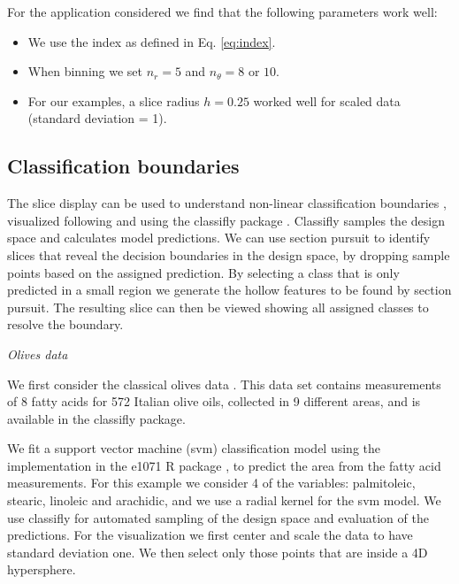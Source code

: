 \documentclass[]{interact}
\theoremstyle{plain}%
\theoremstyle{definition}
\theoremstyle{remark}
\def\tightlist{}
\begin{document}
For the application considered we find that the following parameters
work well:

\begin{itemize}
\tightlist
\item
  We use the index as defined in Eq. \ref{eq:index}.
\item
  When binning we set \(n_r=5\) and \(n_{\theta}=8\) or \(10\).
\item
  For our examples, a slice radius \(h=0.25\) worked well for scaled
  data (standard deviation = 1).
\end{itemize}

\hypertarget{classification-boundaries}{%
\subsection{Classification boundaries}\label{classification-boundaries}}

The slice display can be used to understand non-linear classification
boundaries \citep{laa2019slice}, visualized following \citet{sam.11271}
and using the classifly package \citep{classifly}. Classifly samples the
design space and calculates model predictions. We can use section
pursuit to identify slices that reveal the decision boundaries in the
design space, by dropping sample points based on the assigned
prediction. By selecting a class that is only predicted in a small
region we generate the hollow features to be found by section pursuit.
The resulting slice can then be viewed showing all assigned classes to
resolve the boundary.

\emph{Olives data}

We first consider the classical olives data \citep{olives}. This data
set contains measurements of 8 fatty acids for 572 Italian olive oils,
collected in 9 different areas, and is available in the classifly
package.

We fit a support vector machine (svm) classification model using the
implementation in the e1071 R package \citep{e1071}, to predict the area
from the fatty acid measurements. For this example we consider 4 of the
variables: palmitoleic, stearic, linoleic and arachidic, and we use a
radial kernel for the svm model. We use classifly for automated sampling
of the design space and evaluation of the predictions. For the
visualization we first center and scale the data to have standard
deviation one. We then select only those points that are inside a 4D
hypersphere.
\end{document}
